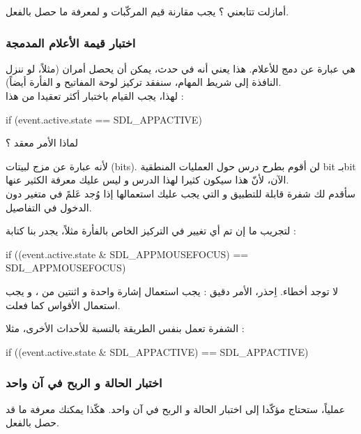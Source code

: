 أمازلت تتابعني ؟ يجب مقارنة قيم المركّبات
و
لمعرفة ما حصل بالفعل.

\subsubsection{اختبار قيمة الأعلام المدمجة}

هي عبارة عن دمج للأعلام. هذا يعني أنه في حدث، يمكن أن يحصل أمران (مثلاً، لو ننزل النافذة إلى شريط المهام، سنفقد تركيز لوحة المفاتيح و الفأرة أيضاً).\\
لهذا، يجب القيام باختبار أكثر تعقيدا من هذا :

\begin{Csource}
if (event.active.state == SDL_APPACTIVE)
\end{Csource}

\begin{question}
لماذا الأمر معقد ؟
\end{question}

لأنه عبارة عن مزج لبيتات 
(\textenglish{bits}).
لن أقوم بطرح درس حول العمليات المنطقية 
\textenglish{bit}
بـ\textenglish{bit}
الآن، لأنّ هذا سيكون كثيرا لهذا الدرس و ليس عليك معرفة الكثير عنها.\\
سأقدم لك شفرة قابلة للتطبيق و التي يجب عليك استعمالها إذا وُجد عَلمً في متغير دون الدخول في التفاصيل. 

لتجريب ما إن تم أي تغيير في التركيز الخاص بالفأرة مثلاً، يجدر بنا كتابة :  

\begin{Csource}
if ((event.active.state & SDL_APPMOUSEFOCUS) == SDL_APPMOUSEFOCUS)
\end{Csource}

لا توجد أخطاء. اِحذر، الأمر دقيق : يجب استعمال إشارة
\InlineCode{\&}
واحدة و اثنتين من
\InlineCode{=}،
و يجب استعمال الأقواس كما فعلت.

الشفرة تعمل بنفس الطريقة بالنسبة للأحداث الأخرى، مثلا :  

\begin{Csource}
if ((event.active.state & SDL_APPACTIVE) == SDL_APPACTIVE)
\end{Csource}

\subsubsection{اختبار الحالة و الربح في آن واحد}

عملياً، ستحتاج مؤكّدا إلى  اختبار الحالة و الربح في آن واحد. هكّذا يمكنك معرفة ما قد حصل بالفعل.

